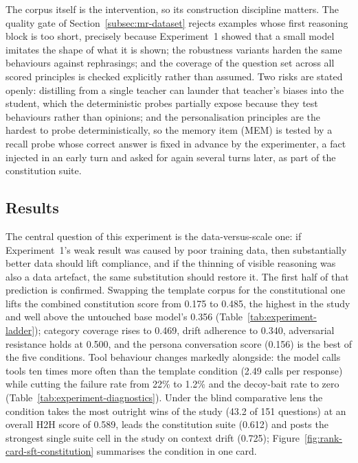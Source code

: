 The corpus itself is the intervention, so its construction discipline matters. The quality gate of Section~\ref{subsec:mr-dataset} rejects examples whose first reasoning block is too short, precisely because Experiment~1 showed that a small model imitates the shape of what it is shown; the robustness variants harden the same behaviours against rephrasings; and the coverage of the question set across all scored principles is checked explicitly rather than assumed. Two risks are stated openly: distilling from a single teacher can launder that teacher's biases into the student, which the deterministic probes partially expose because they test behaviours rather than opinions; and the personalisation principles are the hardest to probe deterministically, so the memory item (MEM) is tested by a recall probe whose correct answer is fixed in advance by the experimenter, a fact injected in an early turn and asked for again several turns later, as part of the constitution suite.

\subsection{Results}
\label{subsec:mr-exp2-results}

The central question of this experiment is the data-versus-scale one: if Experiment~1's weak result was caused by poor training data, then substantially better data should lift compliance, and if the thinning of visible reasoning was also a data artefact, the same substitution should restore it. The first half of that prediction is confirmed. Swapping the template corpus for the constitutional one lifts the combined constitution score from 0.175 to 0.485, the highest in the study and well above the untouched base model's 0.356 (Table~\ref{tab:experiment-ladder}); category coverage rises to 0.469, drift adherence to 0.340, adversarial resistance holds at 0.500, and the persona conversation score (0.156) is the best of the five conditions. Tool behaviour changes markedly alongside: the model calls tools ten times more often than the template condition (2.49 calls per response) while cutting the failure rate from 22\% to 1.2\% and the decoy-bait rate to zero (Table~\ref{tab:experiment-diagnostics}). Under the blind comparative lens the condition takes the most outright wins of the study (43.2 of 151 questions) at an overall H2H score of 0.589, leads the constitution suite (0.612) and posts the strongest single suite cell in the study on context drift (0.725); Figure~\ref{fig:rank-card-sft-constitution} summarises the condition in one card.

